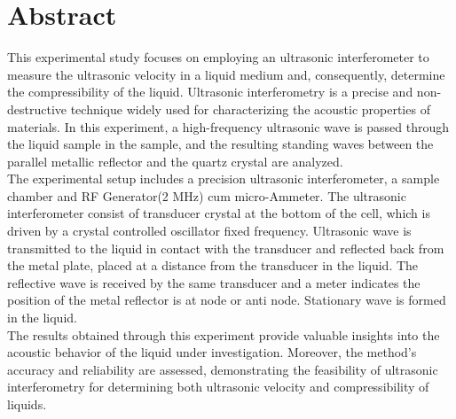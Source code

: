 
\chapter*{Abstract}%
%
%
%

This experimental study focuses on employing an ultrasonic interferometer to measure the ultrasonic velocity in a liquid medium and, consequently, determine the compressibility of the liquid. Ultrasonic interferometry is a precise and non-destructive technique widely used for characterizing the acoustic properties of materials. In this experiment, a high-frequency ultrasonic wave is passed through the liquid sample in the sample, and the resulting standing waves between the parallel metallic reflector and the quartz crystal are analyzed.\\

The experimental setup includes a precision ultrasonic interferometer, a sample chamber and RF Generator(2 MHz) cum micro-Ammeter. The ultrasonic interferometer consist of transducer crystal at the bottom of the cell, which is driven by a crystal controlled oscillator fixed frequency.
Ultrasonic wave is transmitted to the liquid in contact with the transducer and reflected back from the metal plate, placed at a distance from the transducer in the liquid. The reflective wave is received by the same transducer and a meter indicates the position of the metal reflector is at node or anti node. Stationary wave is formed in the liquid.\\

The results obtained through this experiment provide valuable insights into the acoustic behavior of the liquid under investigation. Moreover, the method's accuracy and reliability are assessed, demonstrating the feasibility of ultrasonic interferometry for determining both ultrasonic velocity and compressibility of liquids.\\
\medskip

